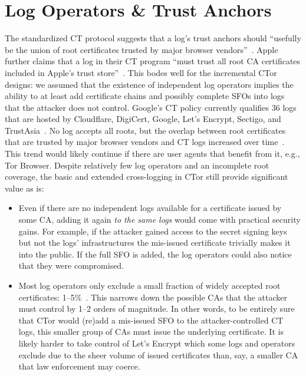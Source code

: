 \section{Log Operators \& Trust Anchors} \label{app:ct-trust-anchors}
The standardized CT protocol suggests that a log's trust anchors should
``usefully be the union of root certificates trusted by major browser
vendors''~\cite{ct,ct/bis}.  Apple further claims that a log in their CT program
``must trust all root CA certificates included in Apple's trust
store''~\cite{apple-log-policy}.  This bodes well for the incremental CTor
designs:
	we assumed that the existence of independent log operators implies the
	ability to at least add certificate chains and possibly complete SFOs
	into logs that the attacker does not control.
Google's CT policy currently qualifies 36 logs that are hosted by
	Cloudflare,
	DigiCert,
	Google,
	Let's Encrypt,
	Sectigo, and
	TrustAsia~\cite{google-log-policy}.
No log accepts all roots, but the overlap between root certificates that are
trusted by major browser vendors and CT logs increased over
time~\cite{ct-root-landscape}.  This trend would likely continue if there are
user agents that benefit from it, e.g., Tor Browser.  Despite relatively few
log operators and an incomplete root coverage, the basic and extended
cross-logging in CTor still provide significant value as is:
\begin{itemize}
	\item Even if there are no independent logs available for a certificate
		issued by some CA, adding it again \emph{to the same logs} would come
		with practical security gains.  For example, if the attacker gained
		access to the secret signing keys but not the logs' infrastructures
		the mis-issued certificate trivially makes it into the public.  If the
		full SFO is added, the log operators could also notice that they were
		compromised.
	\item Most log operators only exclude a small fraction of widely accepted
		root certificates: 1--5\%~\cite{ct-root-landscape}.  This narrows down
		the possible CAs that the attacker must control by 1--2 orders of
		magnitude.  In other words, to be entirely sure that CTor would (re)add
		a mis-issued SFO to the attacker-controlled CT logs, this smaller group
		of CAs must issue the underlying certificate.  It is likely harder to
		take control of Let's Encrypt which some logs and operators exclude due
		to the sheer volume of issued certificates than, say, a smaller CA that
		law enforcement may coerce.
\end{itemize}

